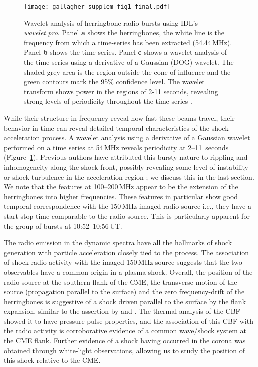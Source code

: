 \begin{figure}[!t]
	\begin{center}
		\texttt{[image: gallagher\_supplem\_fig1\_final.pdf]}
		\caption[Herringbone wavelet analysis]{Wavelet analysis of herringbone radio bursts using IDL's \emph{wavelet.pro}. Panel {\bf a} shows the herringbones, the white line is the frequency from which a time-series has been extracted (54.44\,MHz). Panel {\bf b} shows the time series. Panel {\bf c} shows a wavelet analysis of the time series using a derivative of a Gaussian (DOG) wavelet. The shaded grey area is the region outside the cone of influence and the green contours mark the 95\% confidence level. The wavelet transform shows power in the regions of 2-11 seconds, revealing strong levels of periodicity throughout the time series \citep{carley2013}.}
		\label{fig:wavelet}
	\end{center}
\end{figure}

While their structure in frequency reveal how fast these beams travel, their behavior in time can reveal detailed temporal characteristics of the shock acceleration process.
A wavelet analysis using a derivative of a Gaussian wavelet performed on a time series at 54\,MHz reveals periodicity at 2--11~seconds (Figure~\ref{fig:wavelet}). Previous authors have attributed this bursty nature to rippling and inhomogeneity along the shock front, possibly revealing some level of instability or shock turbulence in the acceleration region \citep{burgess2006, guo2010}; we discuss this in the last section. We note that the features at 100--200\,MHz appear to be the extension of the herringbones into higher frequencies. These features in particular show good temporal correspondence with the 150\,MHz imaged radio source i.e., they have a start-stop time comparable to the radio source. This is particularly apparent for the group of bursts at 10:52--10:56\,UT.

The radio emission in the dynamic spectra have all the hallmarks of shock generation with particle acceleration closely tied to the process. The association of shock radio activity with the imaged 150\,MHz source suggests that the two observables have a common origin in a plasma shock. Overall, the position of the radio source at the southern flank of the CME, the transverse motion of the source (propagation parallel to the surface) and the zero frequency-drift of the herringbones is suggestive of a shock driven parallel to the surface by the flank expansion, similar to the assertion by \cite{stewart1980} and \cite{schmidt2012}. The thermal analysis of the CBF showed it to have pressure pulse properties, and the association of this CBF with the radio activity is corroborative evidence of a common wave/shock system at the CME flank. Further evidence of a shock having occurred in the corona was obtained through white-light observations, allowing us to study the position of this shock relative to the CME.

